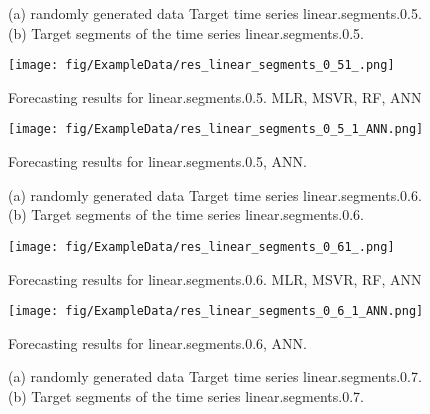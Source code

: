 \documentclass[12pt]{article}
\begin{document}
\begin{figure}
\centering
{}
\caption{(a)	randomly generated data	Target time series	linear.segments.0.5.		(b)		Target segments of the time series	linear.segments.0.5.		}
\end{figure}



\begin{figure}
\centering
\texttt{[image: fig/ExampleData/res\_linear\_segments\_0\_51\_.png]}
\caption{Forecasting results for	linear.segments.0.5.	MLR, MSVR, RF, ANN}
\end{figure}


\begin{figure}
\centering
\texttt{[image: fig/ExampleData/res\_linear\_segments\_0\_5\_1\_ANN.png]}
\caption{Forecasting results for	linear.segments.0.5,	ANN.	}
\end{figure}


\begin{figure}
\centering
{}
\caption{(a)	randomly generated data	Target time series	linear.segments.0.6.		(b)		Target segments of the time series	linear.segments.0.6.		}
\end{figure}



\begin{figure}
\centering
\texttt{[image: fig/ExampleData/res\_linear\_segments\_0\_61\_.png]}
\caption{Forecasting results for	linear.segments.0.6.	MLR, MSVR, RF, ANN}
\end{figure}


\begin{figure}
\centering
\texttt{[image: fig/ExampleData/res\_linear\_segments\_0\_6\_1\_ANN.png]}
\caption{Forecasting results for	linear.segments.0.6,	ANN.	}
\end{figure}


\begin{figure}
\centering
{}
\caption{(a)	randomly generated data	Target time series	linear.segments.0.7.		(b)		Target segments of the time series	linear.segments.0.7.		}
\end{figure}
\end{document}
